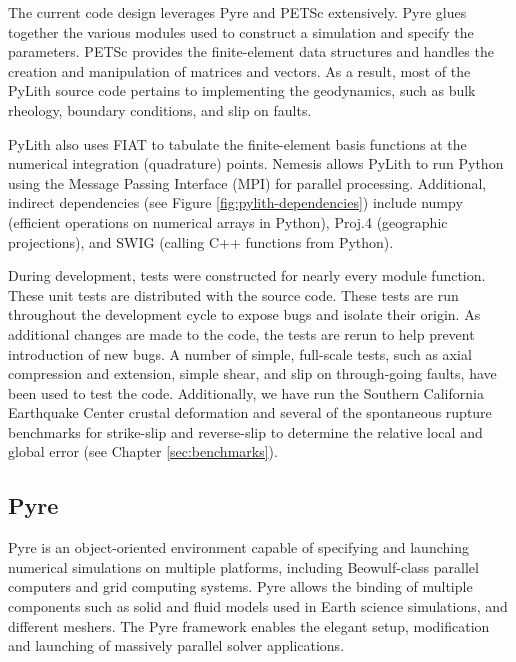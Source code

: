 The current code design leverages Pyre and PETSc extensively. Pyre
glues together the various modules used to construct a simulation and
specify the parameters. PETSc provides the finite-element data
structures and handles the creation and manipulation of matrices and
vectors. As a result, most of the PyLith source code pertains to
implementing the geodynamics, such as bulk rheology, boundary
conditions, and slip on faults.

PyLith also uses FIAT to tabulate the finite-element basis functions
at the numerical integration (quadrature) points. Nemesis allows
PyLith to run Python using the Message Passing Interface (MPI) for
parallel processing. Additional, indirect dependencies (see Figure
\vref{fig:pylith-dependencies}) include numpy (efficient operations on
numerical arrays in Python), Proj.4 (geographic projections), and SWIG
(calling C++ functions from Python).

During development, tests were constructed for nearly every module
function. These unit tests are distributed with the source code. These
tests are run throughout the development cycle to expose bugs and
isolate their origin. As additional changes are made to the code, the
tests are rerun to help prevent introduction of new bugs. A number of
simple, full-scale tests, such as axial compression and extension,
simple shear, and slip on through-going faults, have been used to test
the code. Additionally, we have run the Southern California Earthquake
Center crustal deformation and several of the spontaneous rupture
benchmarks for strike-slip and reverse-slip to determine the relative
local and global error (see Chapter \vref{sec:benchmarks}).

\subsection{Pyre}

Pyre is an object-oriented environment capable of specifying and launching
numerical simulations on multiple platforms, including Beowulf-class
parallel computers and grid computing systems. Pyre allows the binding
of multiple components such as solid and fluid models used in Earth
science simulations, and different meshers. The Pyre framework enables
the elegant setup, modification and launching of massively parallel
solver applications.

